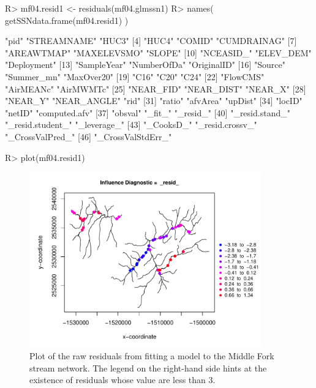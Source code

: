 \documentclass[nojss]{jss}
\renewenvironment{Schunk}{\vspace{\topsep}}{\vspace{\topsep}}
\begin{document}
\begin{Schunk}
\begin{Sinput}
R> mf04.resid1 <- residuals(mf04.glmssn1)
R> names( getSSNdata.frame(mf04.resid1) )
\end{Sinput}
\begin{Soutput}
 [1] "pid"              "STREAMNAME"       "HUC3"            
 [4] "HUC4"             "COMID"            "CUMDRAINAG"      
 [7] "AREAWTMAP"        "MAXELEVSMO"       "SLOPE"           
[10] "NCEASID_"         "ELEV_DEM"         "Deployment"      
[13] "SampleYear"       "NumberOfDa"       "OriginalID"      
[16] "Source"           "Summer_mn"        "MaxOver20"       
[19] "C16"              "C20"              "C24"             
[22] "FlowCMS"          "AirMEANc"         "AirMWMTc"        
[25] "NEAR_FID"         "NEAR_DIST"        "NEAR_X"          
[28] "NEAR_Y"           "NEAR_ANGLE"       "rid"             
[31] "ratio"            "afvArea"          "upDist"          
[34] "locID"            "netID"            "computed.afv"    
[37] "obsval"           "_fit_"            "_resid_"         
[40] "_resid.stand_"    "_resid.student_"  "_leverage_"      
[43] "_CooksD_"         "_resid.crossv_"   "_CrossValPred_"  
[46] "_CrossValStdErr_"
\end{Soutput}
\begin{Sinput}
R> plot(mf04.resid1)
\end{Sinput}
\end{Schunk}

\begin{figure}[htbp]
  \begin{center}
    \includegraphics[keepaspectratio=true, width = 100mm]{Figures/jss984Fig-Model1}
    \caption{Plot of the raw residuals from fitting a model to the Middle Fork stream network. The legend on the right-hand side hints at the existence of residuals whose value are less than 3. \label{Model1}}
  \end{center}
\end{figure}
\end{document}

